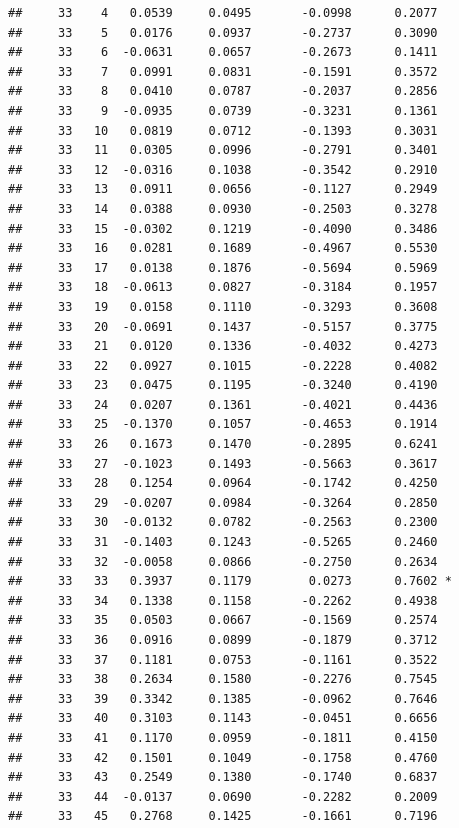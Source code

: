 \documentclass[
]{article}
\begin{document}
\begin{verbatim}
##     33    4   0.0539     0.0495       -0.0998      0.2077  
##     33    5   0.0176     0.0937       -0.2737      0.3090  
##     33    6  -0.0631     0.0657       -0.2673      0.1411  
##     33    7   0.0991     0.0831       -0.1591      0.3572  
##     33    8   0.0410     0.0787       -0.2037      0.2856  
##     33    9  -0.0935     0.0739       -0.3231      0.1361  
##     33   10   0.0819     0.0712       -0.1393      0.3031  
##     33   11   0.0305     0.0996       -0.2791      0.3401  
##     33   12  -0.0316     0.1038       -0.3542      0.2910  
##     33   13   0.0911     0.0656       -0.1127      0.2949  
##     33   14   0.0388     0.0930       -0.2503      0.3278  
##     33   15  -0.0302     0.1219       -0.4090      0.3486  
##     33   16   0.0281     0.1689       -0.4967      0.5530  
##     33   17   0.0138     0.1876       -0.5694      0.5969  
##     33   18  -0.0613     0.0827       -0.3184      0.1957  
##     33   19   0.0158     0.1110       -0.3293      0.3608  
##     33   20  -0.0691     0.1437       -0.5157      0.3775  
##     33   21   0.0120     0.1336       -0.4032      0.4273  
##     33   22   0.0927     0.1015       -0.2228      0.4082  
##     33   23   0.0475     0.1195       -0.3240      0.4190  
##     33   24   0.0207     0.1361       -0.4021      0.4436  
##     33   25  -0.1370     0.1057       -0.4653      0.1914  
##     33   26   0.1673     0.1470       -0.2895      0.6241  
##     33   27  -0.1023     0.1493       -0.5663      0.3617  
##     33   28   0.1254     0.0964       -0.1742      0.4250  
##     33   29  -0.0207     0.0984       -0.3264      0.2850  
##     33   30  -0.0132     0.0782       -0.2563      0.2300  
##     33   31  -0.1403     0.1243       -0.5265      0.2460  
##     33   32  -0.0058     0.0866       -0.2750      0.2634  
##     33   33   0.3937     0.1179        0.0273      0.7602 *
##     33   34   0.1338     0.1158       -0.2262      0.4938  
##     33   35   0.0503     0.0667       -0.1569      0.2574  
##     33   36   0.0916     0.0899       -0.1879      0.3712  
##     33   37   0.1181     0.0753       -0.1161      0.3522  
##     33   38   0.2634     0.1580       -0.2276      0.7545  
##     33   39   0.3342     0.1385       -0.0962      0.7646  
##     33   40   0.3103     0.1143       -0.0451      0.6656  
##     33   41   0.1170     0.0959       -0.1811      0.4150  
##     33   42   0.1501     0.1049       -0.1758      0.4760  
##     33   43   0.2549     0.1380       -0.1740      0.6837  
##     33   44  -0.0137     0.0690       -0.2282      0.2009  
##     33   45   0.2768     0.1425       -0.1661      0.7196  

\end{verbatim}
\end{document}
